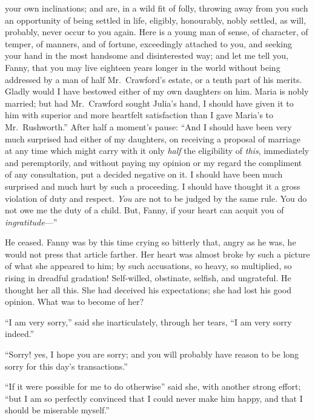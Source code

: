 your own inclinations; and are, in a wild fit of folly,
throwing away from you such an opportunity of being
settled in life, eligibly, honourably, nobly settled,
as will, probably, never occur to you again.  Here is a
young man of sense, of character, of temper, of manners,
and of fortune, exceedingly attached to you, and seeking
your hand in the most handsome and disinterested way;
and let me tell you, Fanny, that you may live eighteen years
longer in the world without being addressed by a man of half
Mr.\ Crawford's estate, or a tenth part of his merits.
Gladly would I have bestowed either of my own daughters
on him.  Maria is nobly married; but had Mr.\ Crawford
sought Julia's hand, I should have given it to him with
superior and more heartfelt satisfaction than I gave
Maria's to Mr.\ Rushworth.''  After half a moment's pause:
``And I should have been very much surprised had either
of my daughters, on receiving a proposal of marriage at any
time which might carry with it only \emph{half} the eligibility
of \emph{this}, immediately and peremptorily, and without paying
my opinion or my regard the compliment of any consultation,
put a decided negative on it.  I should have been much
surprised and much hurt by such a proceeding.  I should
have thought it a gross violation of duty and respect.
\emph{You} are not to be judged by the same rule.  You do not
owe me the duty of a child.  But, Fanny, if your heart
can acquit you of \emph{ingratitude}---''

He ceased.  Fanny was by this time crying so bitterly that,
angry as he was, he would not press that article farther.
Her heart was almost broke by such a picture of what
she appeared to him; by such accusations, so heavy,
so multiplied, so rising in dreadful gradation!
Self-willed, obstinate, selfish, and ungrateful.
He thought her all this.  She had deceived his expectations;
she had lost his good opinion.  What was to become
of her?

``I am very sorry,'' said she inarticulately, through her tears,
``I am very sorry indeed.''

``Sorry! yes, I hope you are sorry; and you will probably
have reason to be long sorry for this day's transactions.''

``If it were possible for me to do otherwise'' said she,
with another strong effort; ``but I am so perfectly
convinced that I could never make him happy, and that I
should be miserable myself.''

